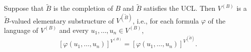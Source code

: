 Suppose that $\tilde{B}$ is the completion of $B$ and $\tilde{B}$ satisfies the UCL. Then $V^{(B)}$ is a $\tilde{B}$-valued elementary substructure of $V^{(\tilde{B})}$, i.e., for each formula $\varphi$ of the language of $V^{(B)}$ and every $u_1, \ldots, u_n \in V^{(B)}$,
$$[\varphi(u_1, \ldots, u_n)]^{V^{(B)}} = [\varphi(u_1, \ldots, u_n)]^{V^{(\tilde{B})}}.$$
